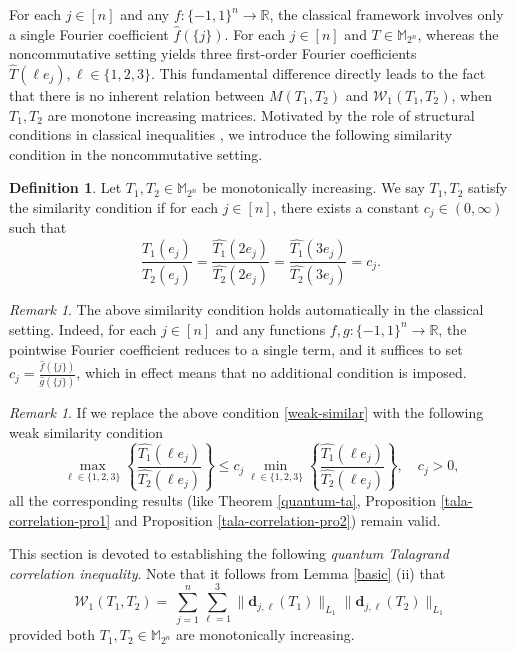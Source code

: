 \documentclass{amsbook}
\theoremstyle{definition}
\newtheorem{definition}[theorem]{Definition}
\theoremstyle{remark}
\newtheorem{remark}[theorem]{Remark}
\numberwithin{section}{chapter}
\numberwithin{equation}{chapter}
\newcommand{\M}{\mathbb{M}}
\newcommand{\1}{\mathbf{1}}
\newcommand{\dc}{\mathbf{d}}
\begin{document}
For each $j\in[n]$ and  any $f:\{-1,1\}^n\rightarrow\mathbb{R}$,   the classical framework involves only a single Fourier coefficient $\widehat{f}(\{j\})$. For each $j\in[n]$ and  $T\in\mathbb{M}_{2^n}$, whereas the noncommutative setting yields three first-order Fourier coefficients $\widehat{T}(\ell e_j), \ell\in\{1,2,3\}$. This fundamental difference directly leads to the fact that there is no inherent relation between $M(T_1,T_2)$ and $\mathcal{W}_1(T_1,T_2)$, when 
$T_1,T_2$ are monotone increasing matrices. Motivated by the role of structural conditions in classical inequalities \cite[Definition 1.6]{KKM2016}, we introduce the following  similarity condition in the noncommutative setting. 
\begin{definition}\label{weak-similar-def}
Let  $T_1,T_2\in \mathbb{M}_{2^n}$ be monotonically increasing. We say $T_1,T_2$ satisfy the  similarity condition if 
for each $j\in[n]$, there exists a constant $c_j\in (0,\infty)$ such that
\begin{equation}\label{weak-similar}
	\frac{\widehat{T_1}(e_j)}{\widehat{T_2}(e_j)}= \frac{\widehat{T_1}(2e_j)}{\widehat{T_2}(2e_j)}= \frac{\widehat{T_1}(3e_j)}{\widehat{T_2}(3e_j)}=c_j.
\end{equation}
\end{definition} 

\begin{remark}\label{rem-similarity}
The above similarity condition holds automatically in the classical setting. Indeed, for each $j\in[n]$ and any functions $f,g:\{-1,1\}^n\rightarrow\mathbb{R}$, the pointwise Fourier coefficient reduces to a single term, and it suffices to set $c_j=\frac{\widehat{f}(\{j\})}{\widehat{g}(\{j\})}$, which in effect means that no additional  condition is imposed. 
\end{remark}



\begin{remark}\label{weak-similar-def2}  If we replace the above condition \eqref{weak-similar} with the following weak similarity condition 
\begin{equation}\label{weak-similar-def2-con}
\max_{\ell\in\{1,2,3\}}\left\{\frac{\widehat{T_1}(\ell e_j)}{\widehat{T_2}(\ell e_j)}\right\}\leq c_j \min_{\ell\in\{1,2,3\}}\left\{\frac{\widehat{T_1}(\ell e_j)}{\widehat{T_2}(\ell e_j)}\right\},\quad c_j>0,
\end{equation}
all the corresponding results (like Theorem \ref{quantum-ta}, Proposition \ref{tala-correlation-pro1} and Proposition \ref{tala-correlation-pro2}) remain valid.
\end{remark}
This section is devoted to establishing the following \emph{quantum Talagrand correlation inequality}. Note that it follows from Lemma \ref{basic} (ii) that 
\begin{equation}
\mathcal{W}_{1}(T_1,T_2)=\	\sum_{j=1}^{n}\sum_{\ell=1}^{3}{\|\dc_{j,\ell}(T_1)\|_{L_{1}}\|\dc_{j,\ell}(T_2)\|_{L_{1}}}
\end{equation}
provided both  $T_1,T_2\in \M_{2^{n}}$ are  monotonically increasing.
\end{document}
